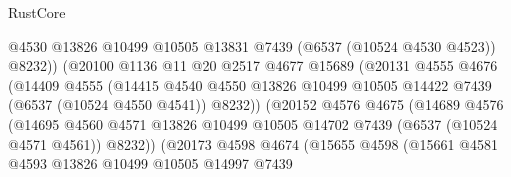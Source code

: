 \begin{lexlean}{RustCore}
\begin{coremodule}
                                  @4530
                                  @13826
                                  @10499
                                  @10505
                                  @13831
                                  @7439
                                  (@6537 (@10524 @4530 @4523))
                                  @8232))
                              (@20100
                                @1136
                                @11
                                @20
                                @2517
                                @4677
                                @15689
                                (@20131
                                  @4555
                                  @4676
                                  (@14409
                                    @4555
                                    (@14415
                                      @4540
                                      @4550
                                      @13826
                                      @10499
                                      @10505
                                      @14422
                                      @7439
                                      (@6537 (@10524 @4550 @4541))
                                      @8232))
                                  (@20152
                                    @4576
                                    @4675
                                    (@14689
                                      @4576
                                      (@14695
                                        @4560
                                        @4571
                                        @13826
                                        @10499
                                        @10505
                                        @14702
                                        @7439
                                        (@6537 (@10524 @4571 @4561))
                                        @8232))
                                    (@20173
                                      @4598
                                      @4674
                                      (@15655
                                        @4598
                                        (@15661
                                          @4581
                                          @4593
                                          @13826
                                          @10499
                                          @10505
                                          @14997
                                          @7439

\end{coremodule}
\end{lexlean}
